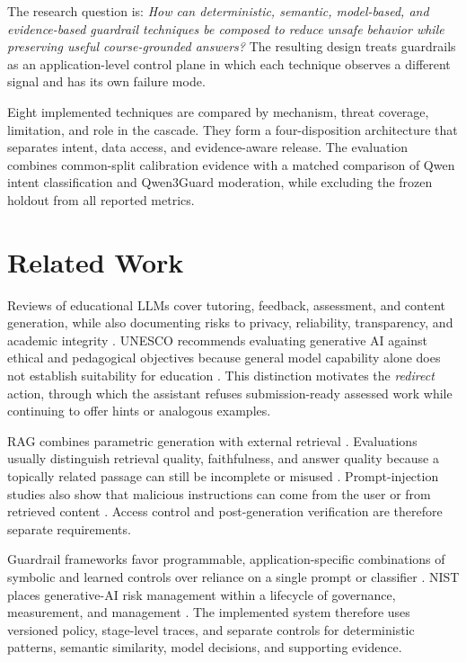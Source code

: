 \documentclass[conference,a4paper]{IEEEtran}
\begin{document}
The research question is: \emph{How can deterministic, semantic, model-based, and evidence-based guardrail techniques be composed to reduce unsafe behavior while preserving useful course-grounded answers?} The resulting design treats guardrails as an application-level control plane in which each technique observes a different signal and has its own failure mode.

Eight implemented techniques are compared by mechanism, threat coverage, limitation, and role in the cascade. They form a four-disposition architecture that separates intent, data access, and evidence-aware release. The evaluation combines common-split calibration evidence with a matched comparison of Qwen intent classification and Qwen3Guard moderation, while excluding the frozen holdout from all reported metrics.

\section{Related Work}

Reviews of educational LLMs cover tutoring, feedback, assessment, and content generation, while also documenting risks to privacy, reliability, transparency, and academic integrity \cite{wang2024llmedu,yan2023education}. UNESCO recommends evaluating generative AI against ethical and pedagogical objectives because general model capability alone does not establish suitability for education \cite{unesco2023guidance}. This distinction motivates the \emph{redirect} action, through which the assistant refuses submission-ready assessed work while continuing to offer hints or analogous examples.

RAG combines parametric generation with external retrieval \cite{lewis2020rag}. Evaluations usually distinguish retrieval quality, faithfulness, and answer quality because a topically related passage can still be incomplete or misused \cite{es2023ragas,huang2023hallucination}. Prompt-injection studies also show that malicious instructions can come from the user or from retrieved content \cite{liu2023promptinjection,greshake2023indirect}. Access control and post-generation verification are therefore separate requirements.

Guardrail frameworks favor programmable, application-specific combinations of symbolic and learned controls over reliance on a single prompt or classifier \cite{rebedea2023nemo,dong2024guardrails}. NIST places generative-AI risk management within a lifecycle of governance, measurement, and management \cite{nist2024genai}. The implemented system therefore uses versioned policy, stage-level traces, and separate controls for deterministic patterns, semantic similarity, model decisions, and supporting evidence.
\end{document}
